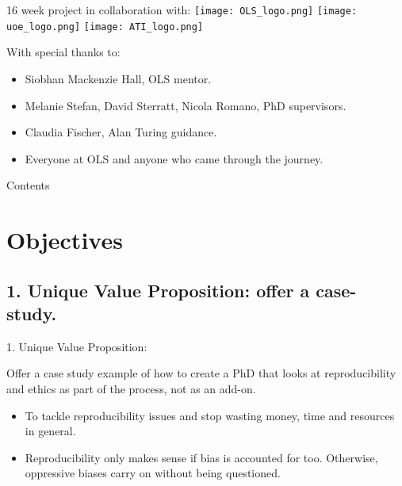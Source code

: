 \documentclass[t]{beamer}
\subtitle{Ethical standards and reproducibility of computer models in Neurobiology}
\date{19/01/2022}
\author{Susana Roman Garcia}
\begin{document}
\begin{frame}
	\titlepage
\end{frame}

\begin{frame}{16 week project in collaboration with:}
    \hfill \break
	\texttt{[image: OLS\_logo.png]}
        \texttt{[image: uoe\_logo.png]}
        \texttt{[image: ATI\_logo.png]}
\end{frame}

\begin{frame}{With special thanks to:}
    \begin{itemize}
        \item Siobhan Mackenzie Hall, OLS mentor.

        \item Melanie Stefan, David Sterratt, Nicola Romano, PhD supervisors.

        \item Claudia Fischer, Alan Turing guidance.

        \item Everyone at OLS and anyone who came through the journey.
    \end{itemize}
\end{frame}

\begin{frame}{Contents}
	\tableofcontents
\end{frame}

\section{Objectives}
\subsection{1. Unique Value Proposition: offer a case-study.}
\begin{frame}{1. Unique Value Proposition:}
	\begin{block}{Offer a case study example of how to create a PhD that looks at reproducibility and ethics as part of the process, not as an add-on.}
        \hfill \break
  		\begin{itemize}    
  			\item To tackle reproducibility issues and stop wasting money, time and resources in general.
  			\item Reproducibility only makes sense if bias is accounted for too. Otherwise, oppressive biases carry on without being questioned.
  		\end{itemize}    
	\end{block}
\end{frame}
\end{document}

